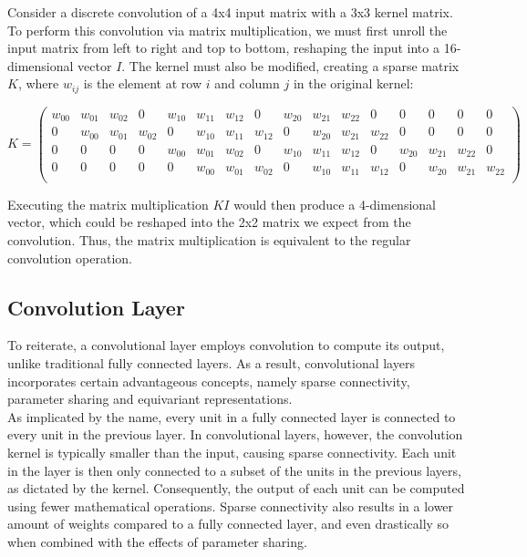 \noindent Consider a discrete convolution of a 4x4 input matrix with a 3x3 kernel matrix. To perform this convolution via matrix multiplication, we must first unroll the input matrix from left to right and top to bottom, reshaping the input into a 16-dimensional vector $I$. The kernel must also be modified, creating a sparse matrix $K$, where $w_{ij}$ is the element at row $i$ and column $j$ in the original kernel:

\[
    K = 
    \left(
    \begin{smallmatrix}
    \textit{$w_{00}$} & \textit{$w_{01}$} & \textit{$w_{02}$} & 0 & \textit{$w_{10}$} & \textit{$w_{11}$} & \textit{$w_{12}$} & 0 & \textit{$w_{20}$} & \textit{$w_{21}$} & \textit{$w_{22}$} & 0 & 0 & 0 & 0 & 0 \\
    0 & \textit{$w_{00}$} & \textit{$w_{01}$} & \textit{$w_{02}$} & 0 & \textit{$w_{10}$} & \textit{$w_{11}$} & \textit{$w_{12}$} & 0 & \textit{$w_{20}$} & \textit{$w_{21}$} & \textit{$w_{22}$} & 0 & 0 & 0 & 0 \\
    0 & 0 & 0 & 0 & \textit{$w_{00}$} & \textit{$w_{01}$} & \textit{$w_{02}$} & 0 & \textit{$w_{10}$} & \textit{$w_{11}$} & \textit{$w_{12}$} & 0 & \textit{$w_{20}$} & \textit{$w_{21}$} & \textit{$w_{22}$} & 0 \\
    0 & 0 & 0 & 0 & 0 & \textit{$w_{00}$} & \textit{$w_{01}$} & \textit{$w_{02}$} & 0 & \textit{$w_{10}$} & \textit{$w_{11}$} & \textit{$w_{12}$} & 0 & \textit{$w_{20}$} & \textit{$w_{21}$} & \textit{$w_{22}$} \\
    \end{smallmatrix}
    \right)
\]

\noindent Executing the matrix multiplication $KI$ would then produce a 4-dimensional vector, which could be reshaped into the 2x2 matrix we expect from the convolution. Thus, the matrix multiplication is equivalent to the regular convolution operation.


\subsection{Convolution Layer}

To reiterate, a convolutional layer employs convolution to compute its output, unlike traditional fully connected layers. As a result, convolutional layers incorporates certain advantageous concepts, namely sparse connectivity, parameter sharing and equivariant representations. \\

\noindent As implicated by the name, every unit in a fully connected layer is connected to every unit in the previous layer. In convolutional layers, however, the convolution kernel is typically smaller than the input, causing sparse connectivity. Each unit in the layer is then only connected to a subset of the units in the previous layers, as dictated by the kernel. Consequently, the output of each unit can be computed using fewer mathematical operations. Sparse connectivity also results in a lower amount of weights compared to a fully connected layer, and even drastically so when combined with the effects of parameter sharing. \\

